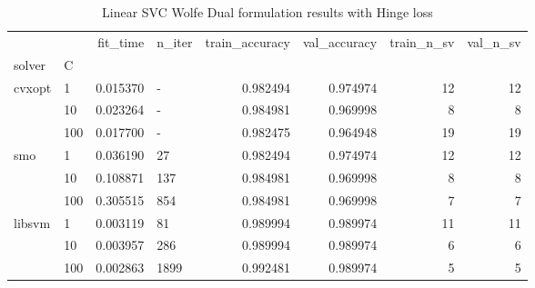 \begin{table}[h!]
\centering
\caption{Linear SVC Wolfe Dual formulation results with Hinge loss}
\label{linear_dual_svc_cv_results}
\begin{tabular}{llrlrrrr}
\toprule
       &     &  fit\_time & n\_iter &  train\_accuracy &  val\_accuracy &  train\_n\_sv &  val\_n\_sv \\
solver & C &           &        &                 &               &             &           \\
\midrule
cvxopt & 1   &  0.015370 &      - &        0.982494 &      0.974974 &          12 &        12 \\
       & 10  &  0.023264 &      - &        0.984981 &      0.969998 &           8 &         8 \\
       & 100 &  0.017700 &      - &        0.982475 &      0.964948 &          19 &        19 \\
smo & 1   &  0.036190 &     27 &        0.982494 &      0.974974 &          12 &        12 \\
       & 10  &  0.108871 &    137 &        0.984981 &      0.969998 &           8 &         8 \\
       & 100 &  0.305515 &    854 &        0.984981 &      0.969998 &           7 &         7 \\
libsvm & 1   &  0.003119 &     81 &        0.989994 &      0.989974 &          11 &        11 \\
       & 10  &  0.003957 &    286 &        0.989994 &      0.989974 &           6 &         6 \\
       & 100 &  0.002863 &   1899 &        0.992481 &      0.989974 &           5 &         5 \\
\bottomrule
\end{tabular}
\end{table}
